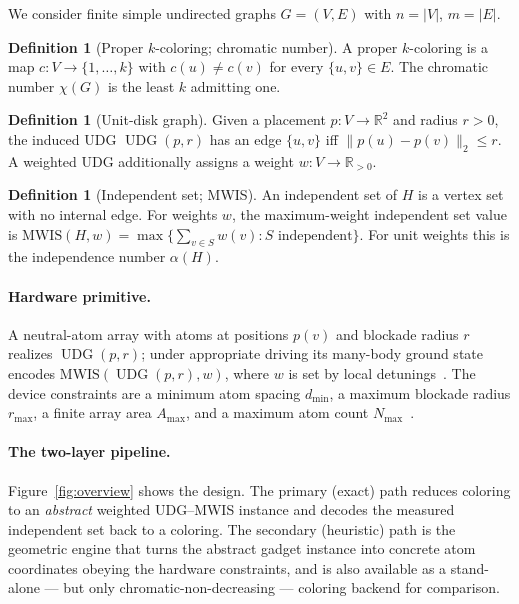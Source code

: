 \documentclass[11pt]{article}
\theoremstyle{definition}
\newtheorem{definition}[theorem]{Definition}
\theoremstyle{remark}
\newcommand{\UDG}{\operatorname{UDG}}
\newcommand{\MWIS}{\mathrm{MWIS}}
\newcommand{\R}{\mathbb{R}}
\newcommand{\indep}{\alpha}
\begin{document}
We consider finite simple undirected graphs $G=(V,E)$ with $n=|V|$, $m=|E|$.

\begin{definition}[Proper $k$-coloring; chromatic number]
A proper $k$-coloring is a map $c:V\to\{1,\dots,k\}$ with $c(u)\ne c(v)$ for every
$\{u,v\}\in E$. The chromatic number $\chi(G)$ is the least $k$ admitting one.
\end{definition}

\begin{definition}[Unit-disk graph]
Given a placement $p:V\to\R^2$ and radius $r>0$, the induced UDG $\UDG(p,r)$ has an
edge $\{u,v\}$ iff $\|p(u)-p(v)\|_2\le r$. A weighted UDG additionally assigns a
weight $w:V\to\R_{>0}$.
\end{definition}

\begin{definition}[Independent set; MWIS]
An independent set of $H$ is a vertex set with no internal edge. For weights $w$,
the maximum-weight independent set value is
$\MWIS(H,w)=\max\{\sum_{v\in S}w(v):S\text{ independent}\}$. For unit weights this
is the independence number $\indep(H)$.
\end{definition}

\paragraph{Hardware primitive.} A neutral-atom array with atoms at positions
$p(v)$ and blockade radius $r$ realizes $\UDG(p,r)$; under appropriate driving its
many-body ground state encodes $\MWIS(\UDG(p,r),w)$, where $w$ is set by local
detunings~\cite{Pichler2018,Ebadi2022}. The device constraints are a minimum atom
spacing $d_{\min}$, a maximum blockade radius $r_{\max}$, a finite array area
$A_{\max}$, and a maximum atom count $N_{\max}$~\cite{Wurtz2023}.

\paragraph{The two-layer pipeline.} Figure~\ref{fig:overview} shows the design.
The primary (exact) path reduces coloring to an \emph{abstract} weighted UDG--MWIS
instance and decodes the measured independent set back to a coloring. The
secondary (heuristic) path is the geometric engine that turns the abstract gadget
instance into concrete atom coordinates obeying the hardware constraints, and is
also available as a stand-alone --- but only chromatic-non-decreasing --- coloring
backend for comparison.
\end{document}
